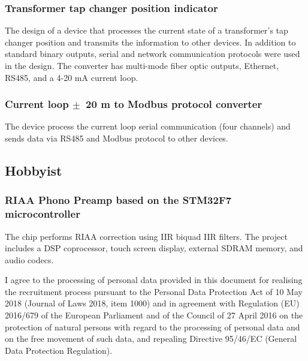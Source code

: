 \documentclass[letterpaper]{template/twentysecondcv} %
\begin{document}
\subsubsection*{Transformer tap changer position indicator}
The design of a device that processes the current state of a transformer's tap changer position and transmits the information to other devices. In addition to standard binary outputs, serial and network communication protocols were used in the design. The converter has multi-mode fiber optic outputs, Ethernet, RS485, and a 4-20 mA current loop.

\subsubsection*{Current loop $\pm$~20 m to Modbus protocol converter}
The device process the current loop serial communication (four channels) and sends data via RS485 and Modbus protocol to other devices.


\subsection{Hobbyist}
\vspace{-0.25cm}
\subsubsection*{RIAA Phono Preamp based on the STM32F7 microcontroller}
The chip performs RIAA correction using IIR biquad IIR filters. The project includes a DSP coprocessor, touch screen display, external SDRAM memory, and audio codecs.



%

\vspace{0.9cm}
\tiny{I agree to the processing of personal data provided in this document for realising the recruitment process pursuant to the Personal Data Protection Act of 10 May 2018 (Journal of Laws 2018, item 1000) and in agreement with Regulation (EU) 2016/679 of the European Parliament and of the Council of 27 April 2016 on the protection of natural persons with regard to the processing of personal data and on the free movement of such data, and repealing Directive 95/46/EC (General Data Protection Regulation).}
\end{document}
